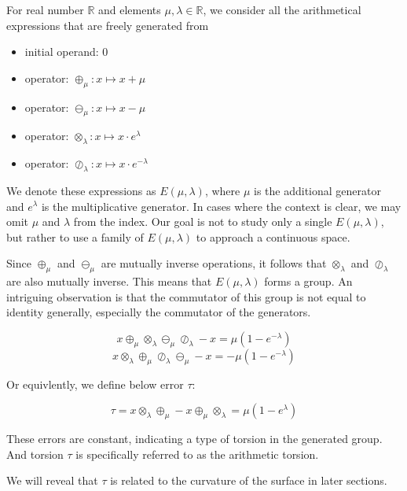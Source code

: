 For real number $\mathbb{R}$ and elements $\mu, \lambda \in \mathbb{R}$, we consider all the arithmetical expressions
that are freely generated from
\begin{itemize}
    \item initial operand: $0$
    \item operator: $\oplus_\mu: x \mapsto x + \mu$
    \item operator: $\ominus_\mu: x \mapsto x - \mu$
    \item operator: $\otimes_\lambda: x \mapsto x \cdot e^\lambda$
    \item operator: $\oslash_\lambda: x \mapsto x \cdot e^{- \lambda}$
\end{itemize}

We denote these expressions as $E(\mu, \lambda)$, where $\mu$ is the additional generator and $e^\lambda$ is the multiplicative generator.
In cases where the context is clear, we may omit $\mu$ and $\lambda$ from the index.
Our goal is not to study only a single $E(\mu, \lambda)$, but rather to use a family of $E(\mu, \lambda)$ to approach a continuous space.

Since $\oplus_\mu$ and $\ominus_\mu$ are mutually inverse operations, it follows that $\otimes_\lambda$ and $\oslash_\lambda$ are also mutually inverse.
This means that $E(\mu, \lambda)$ forms a group. An intriguing observation is that the commutator of this group is not equal to identity generally,
especially the commutator of the generators.

\begin{equation}
x \oplus_\mu \otimes_\lambda \ominus_\mu \oslash_\lambda - x = \mu(1 - e^{-\lambda})
\end{equation}
\begin{equation}
x \otimes_\lambda \oplus_\mu \oslash_\lambda \ominus_\mu - x = - \mu(1 - e^{-\lambda})
\end{equation}

Or equivlently, we define below error $\tau$:

\begin{equation}
\tau = x \otimes_\lambda \oplus_\mu - x \oplus_\mu \otimes_\lambda = \mu(1 - e^\lambda)
\end{equation}

These errors are constant, indicating a type of torsion in the generated group.
And torsion $\tau$ is specifically referred to as the arithmetic torsion.

We will reveal that $\tau$ is related to the curvature of the surface in later sections.

